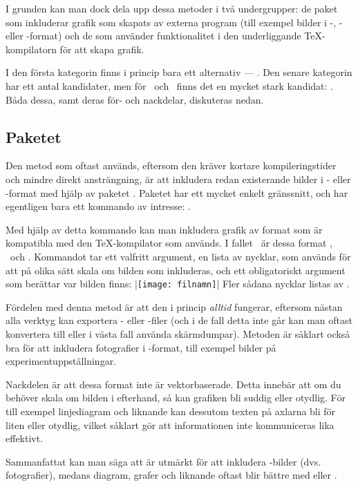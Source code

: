 \documentclass[10pt,../../a4.tex]{subfiles}
\begin{document}
I grunden kan man dock dela upp dessa metoder i två undergrupper: de
paket som inkluderar grafik som skapats av externa program (till
exempel bilder i \PDF-, \PNG- eller \JPEG-format) och de som använder
funktionalitet i den underliggande \TeX-kompilatorn för att skapa grafik.

I den första kategorin finns i princip bara ett alternativ
— . Den senare kategorin har ett antal kandidater,
men för \pdfLaTeX\ och \XeTeX\ finns det en mycket stark kandidat:
\PGFTikZ. Båda dessa, samt deras för- och nackdelar, diskuteras nedan.

\subsection{Paketet }
Den metod som oftast används, eftersom den kräver kortare
kompileringstider och mindre direkt ansträngning, är att inkludera
redan existerande bilder i \PDF- eller \PNG-format med hjälp av
paketet . Paketet har ett mycket enkelt gränssnitt, och
har egentligen bara ett kommando av intresse: .

Med hjälp av detta kommando kan man inkludera grafik av format som är
kompatibla med den \TeX-kompilator som används. I fallet \pdfLaTeX\ är
dessa format \PNG, \PDF\ och \JPEG. Kommandot tar ett valfritt
argument, en lista av nycklar, som används för att på olika sätt
skala om bilden som inkluderas, och ett obligatoriskt argument som
berättar var bilden finns:
\latex|\texttt{[image: filnamn]}|
Fler sådana nycklar listas av \textcite[8\psq]{Carlisle05}.

Fördelen med denna metod är att den i princip \emph{alltid} fungerar,
eftersom nästan alla verktyg kan exportera \PNG- eller \PDF-filer (och
i de fall detta inte går kan man oftast konvertera till \PNG eller i
västa fall använda skärmdumpar). Metoden är såklart också bra för att
inkludera fotografier i \JPEG-format, till exempel bilder på
experimentuppställningar.

Nackdelen är att dessa format inte är vektorbaserade. Detta innebär att
om du behöver skala om bilden i efterhand, så kan grafiken bli suddig
eller otydlig. För till exempel linjediagram och liknande kan dessutom
texten på axlarna bli för liten eller otydlig, vilket såklart gör att
informationen inte kommuniceras lika effektivt. 

Sammanfattat kan man säga att  är utmärkt för att
inkludera \JPEG-bilder (dvs. fotografier), medans diagram, grafer och
liknande oftast blir bättre med \PGFTikZ eller .
\end{document}
